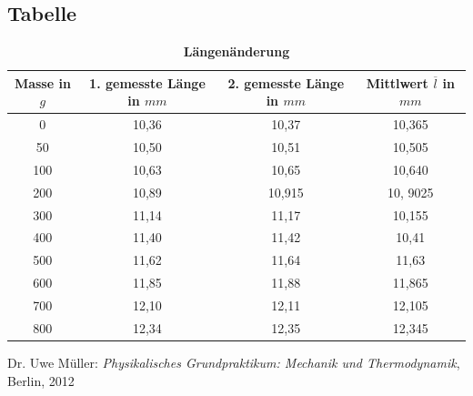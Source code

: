 \documentclass[a4paper,11pt]{article}
\begin{document}
\subsection{Tabelle}
\begin{table}[ht] \centering \caption {\bf Längenänderung}	
\begin{tabular}{c|c|c|c|}
Masse in $g$ & 1. gemesste Länge in $mm$ & 2. gemesste Länge in $mm$ & Mittlwert $\overline l$ in $mm$ \\ \hline
0 & 10,36 & 10,37 & 10,365\\
50 & 10,50 & 10,51 & 10,505\\
100 & 10,63 & 10,65 & 10,640\\
200 & 10,89 & 10,915 & 10, 9025\\
300 & 11,14 & 11,17 & 10,155\\
400 & 11,40 & 11,42 & 10,41\\
500 & 11,62 & 11,64 & 11,63\\
600 & 11,85 & 11,88 & 11,865\\
700 & 12,10 & 12,11 & 12,105\\
800 & 12,34 & 12,35 & 12,345
\end{tabular}
\end{table}
	

	\begin{thebibliography}{1}
		Dr. Uwe Müller: \textit{Physikalisches Grundpraktikum: Mechanik und Thermodynamik}, Berlin, 2012
	\end{thebibliography}
\end{document}
